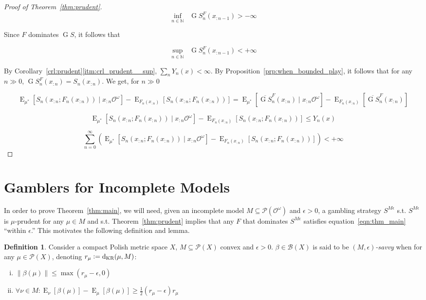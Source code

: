 \documentclass[11pt]{article}
\theoremstyle{definition}
\newtheorem{definition}{Definition}%
\theoremstyle{plain}
\newcommand{\Nats}{\mathbb{N}}
\newcommand{\N}[1]{\lVert #1 \rVert}
\DeclareMathOperator{\E}{E}
\newcommand{\PM}{\mathcal{P}}
\newcommand{\DKR}{\operatorname{d}_{\textnormal{KR}}}
\newcommand{\Ob}{\mathcal{O}}
\newcommand{\OO}{\Ob^\omega}
\newcommand{\PMO}{\PM(\OO)}
\newcommand{\Gm}{\mathcal{B}}
\DeclareMathOperator{\SVM}{\Sigma V_{\min}}
\DeclareMathOperator{\SVX}{\Sigma V_{\max}}
\DeclareMathOperator{\PG}{G}
\begin{document}
\begin{proof}[Proof of Theorem~\ref{thm:prudent}]
\[\inf_{n \in \Nats} \SVM \PG{S}^F_{n}(x_{:n-1}) > -\infty\]

Since $F$ dominates $\PG{S}$, it follows that

\[\sup_{n \in \Nats} \SVX \PG{S}^F_{n}(x_{:n-1}) < +\infty\] 

By Corollary~\ref*{crl:prudent}\ref{itm:crl_prudent__sup}, $\sum_n Y_n(x) < \infty$. By Proposition~\ref{prp:when_bounded_play}, it follows that for any $n \gg 0$, $\PG{S}^F_n(x_{:n}) = S_n(x_{:n})$. We get, for $n \gg 0$

$$\E_{\mu^*}[S_n(x_{:n};F_n(x_{:n})) \mid x_{:n}\OO]-\E_{F_n(x_{:n})}[S_n(x_{:n};F_n(x_{:n}))] = \E_{\mu^*}[\overline{\PG{S}}^F_n(x_{:n}) \mid x_{:n}\OO]-\E_{F_n(x_{:n})}[\overline{\PG{S}}^F_n(x_{:n})]$$

$$\E_{\mu^*}[S_n(x_{:n};F_n(x_{:n})) \mid x_{:n}\OO]-\E_{F_n(x_{:n})}[S_n(x_{:n};F_n(x_{:n}))] \leq Y_n(x)$$

$$\sum_{n=0}^\infty (\E_{\mu^*}[S_n(x_{:n};F_n(x_{:n})) \mid x_{:n}\OO]-\E_{F_n(x_{:n})}[S_n(x_{:n};F_n(x_{:n}))]) < +\infty$$
\end{proof}

\section{Gamblers for Incomplete Models}
\label{sec:construction}

In order to prove Theorem~\ref{thm:main}, we will need, given an incomplete model $M \subseteq \PMO$ and $\epsilon > 0$, a gambling strategy $S^{M\epsilon}$ s.t. $S^{M\epsilon}$ is $\mu$-prudent for any $\mu \in M$ and s.t. Theorem~\ref{thm:prudent} implies that any $F$ that dominates $S^{M\epsilon}$ satisfies equation~\ref{eqn:thm_main} \enquote{within $\epsilon$.} This motivates the following definition and lemma.

\begin{samepage}
\begin{definition}

Consider a compact Polish metric space $X$, $M \subseteq \PM(X)$ convex and $\epsilon > 0$. $\beta \in \Gm(X)$ is said to be \emph{$(M,\epsilon)$-savvy} when for any $\mu \in \PM(X)$, denoting $r_\mu:=\DKR(\mu,M)$:

\begin{enumerate}[i.]

\item $\N{\beta(\mu)} \leq \max(r_\mu - \epsilon,0)$
\item $\forall \nu \in M: \E_\nu[\beta(\mu)] - \E_\mu[\beta(\mu)] \geq \frac{1}{2}(r_\mu - \epsilon) r_\mu$

\end{enumerate}

\end{definition}
\end{samepage}
\end{document}
